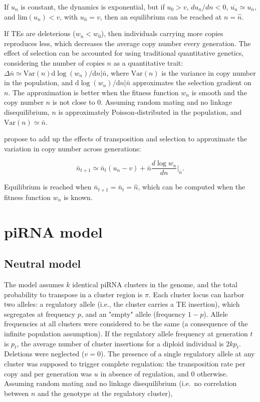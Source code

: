 \documentclass[10pt,a4paper]{article}
\begin{document}
If $u_n$ is constant, the dynamics is exponential, but if $u_0 > v$, $d u_n / d n < 0$, $\overline{u_n} \simeq u_{\bar n}$, and $\mathrm{lim} (u_n) < v$, with $u_{\hat n} = v$, then an equilibrium can be reached at $n = \hat n$. 

If TEs are deleterious ($w_n < w_0$), then individuals carrying more copies reproduces less, which decreases the average copy number every generation. The effect of selection can be accounted for using traditional quantitative genetics, considering the number of copies $n$ as a quantitative trait: $\Delta \bar n \simeq \mathrm{Var}(n) \mathrm d \log(w_n)/ \mathrm d n | \bar n$, where $\mathrm{Var}(n)$ is the variance in copy number in the population, and $\mathrm d \log(w_n)/ \mathrm d n | \bar n$  approximates the selection gradient on $n$. The approximation is better when the fitness function $w_n$ is smooth and the copy number $n$ is not close to 0. Assuming random mating and no linkage disequilibrium, $n$ is approximately Poisson-distributed in the population, and $\mathrm{Var}(n) \simeq \bar n$. 

\cite{CC83} propose to add up the effects of transposition and selection to approximate the variation in copy number across generations:

\begin{equation}\label{eq:cc2}
\bar n_{t+1} \simeq \bar n_t(u_n - v) + \bar n \frac{d \log w_n}{d n} \Bigr|_{\bar n}.
\end{equation}

Equilibrium is reached when $\bar n_{t+1} = \bar n_t = \hat n$, which can be computed when the fitness function $w_n$ is known. 


\section{piRNA model}

\subsection{Neutral model} 

The model assumes $k$ identical piRNA clusters in the genome, and the total probability to transpose in a cluster region is $\pi$. Each cluster locus can harbor two alleles: a regulatory allele (i.e., the cluster carries a TE insertion), which segregates at frequency $p$, and an "empty" allele (frequency $1-p$). Allele frequencies at all clusters were considered to be the same (a consequence of the infinite population assumption). If the regulatory allele frequency at generation $t$ is $p_t$, the average number of cluster insertions for a diploid individual is $2kp_t$. Deletions were neglected ($v=0$). The presence of a single regulatory allele at any cluster was supposed to trigger complete regulation: the transposition rate per copy and per generation was $u$ in absence of regulation, and $0$ otherwise. Assuming random mating and no linkage disequilibrium (i.e.\ no correlation between $n$ and the genotype at the regulatory cluster),
\end{document}
